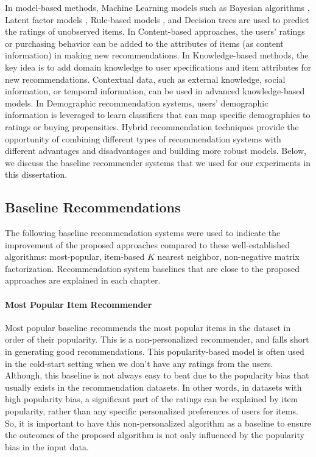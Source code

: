     In model-based methods, Machine Learning models such as Bayesian algorithms \cite{miyahara2000collaborative}, Latent factor models \cite{Canny2002CF,Aggarwal2001Min}, Rule-based models \cite{Mobasher2001Rule}, and Decision trees \cite{aggarwal2015data} are used to predict the ratings of unobserved items. In Content-based approaches, the users’ ratings or purchasing behavior can be added to the attributes of items (as content information) in making new recommendations. In Knowledge-based methods, the key idea is to add domain knowledge to user specifications and item attributes for new recommendations. Contextual data, such as external knowledge, social information, or temporal information, can be used in advanced knowledge-based models. In Demographic recommendation systems, users’ demographic information is leveraged to learn classifiers that can map specific demographics to ratings or buying propensities. Hybrid recommendation techniques provide the opportunity of combining different types of recommendation systems with different advantages and disadvantages and building more robust models. Below, we discuss the baseline recommender systems that we used for our experiments in this dissertation.
    

    \subsection{Baseline Recommendations}
    
        The following baseline recommendation systems were used to indicate the improvement of the proposed approaches compared to these well-established algorithms: most-popular, item-based $K$ nearest neighbor, non-negative matrix factorization. Recommendation system baselines that are close to the proposed approaches are explained in each chapter.
        
        \vspace{0.25cm}
        \noindent \paragraph{Most Popular Item Recommender}
        \vspace{0.25cm}
        
            Most popular baseline recommends the most popular items in the dataset in order of their popularity. This is a non-personalized recommender, and falls short in generating good recommendations. This popularity-based model is often used in the cold-start setting when we don't have any ratings from the users. Although, this baseline is not always easy to beat due to the popularity bias that usually exists in the recommendation datasets. In other words, in datasets with high popularity bias, a significant part of the ratings can be explained by item popularity, rather than any specific personalized preferences of users for items. So, it is important to have this non-personalized algorithm as a baseline to ensure the outcomes of the proposed algorithm is not only influenced by the popularity bias in the input data.
        

